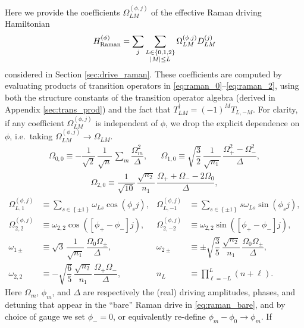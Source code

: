 \documentclass[nofootinbib,notitlepage,11pt]{revtex4-2}
\renewcommand{\t}{\text} %
\newcommand{\f}[2]{\dfrac{#1}{#2}} %
\newcommand{\p}[1]{\left(#1\right)} %
\renewcommand{\sp}[1]{\left[#1\right]} %
\renewcommand{\set}[1]{\left\{#1\right\}} %
\newcommand{\1}{\mathds{1}}
\begin{document}
Here we provide the coefficients $\Omega_{LM}^{(\phi,j)}$ of the
effective Raman driving Hamiltonian
\begin{align}
  H_{\t{Raman}}^{(\phi)}
  = \sum_j \sum_{\substack{L\in\set{0,1,2}\\\abs{M}\le L}}
  \Omega_{LM}^{(\phi,j)} D_{LM}^{(j)}
\end{align}
considered in Section \ref{sec:drive_raman}.  These coefficients are
computed by evaluating products of transition operators in
\eqref{eq:raman_0}--\eqref{eq:raman_2}, using both the structure
constants of the transition operator algebra (derived in Appendix
\ref{sec:trans_prod}) and the fact that
$T_{LM}^\dag = \p{-1}^M T_{L,-M}$.  For clarity, if any coefficient
$\Omega_{LM}^{(\phi,j)}$ is independent of $\phi$, we drop the
explicit dependence on $\phi$, i.e.~taking
$\Omega_{LM}^{(\phi,j)}\to\Omega_{LM}$.
\begin{align}
  \Omega_{0,0} \equiv -\f1{\sqrt{2}}\, \f1{\sqrt{n}}\,
  \sum_m\f{\Omega_m^2}{\Delta},
  &&
  \Omega_{1,0} \equiv \sqrt{\f32}\, \f1{\sqrt{n_1}}\,
  \f{\Omega_+^2 - \Omega_-^2}{\Delta},
  \label{eq:O_01_0}
\end{align}
\begin{align}
  \Omega_{2,0} \equiv \f1{\sqrt{10}}\, \f{\sqrt{n_2}}{n_1}\,
  \f{\Omega_+ + \Omega_- - 2\Omega_0}{\Delta},
  \label{eq:O_2_0}
\end{align}
\begin{align}
  \Omega_{L,1}^{(\phi,j)}
  &\equiv \sum_{s\in\set{\pm1}} \omega_{Ls} \cos\p{\phi_s j},
  &
  \Omega_{L,-1}^{(\phi,j)}
  &\equiv \sum_{s\in\set{\pm1}} s \omega_{Ls} \sin\p{\phi_s j}, \\
  \Omega_{2,2}^{(\phi,j)}
  &\equiv \omega_{2,2} \cos\p{\sp{\phi_+-\phi_-}j},
  &
  \Omega_{2,-2}^{(\phi,j)}
  &\equiv \omega_{2,2} \sin\p{\sp{\phi_+-\phi_-}j}, \\
  \omega_{1\pm}
  &\equiv \sqrt{3} \,\f1{\sqrt{n_1}}\,
  \f{\Omega_0 \Omega_\pm}{\Delta},
  &
  \omega_{2\pm}
  &\equiv \pm \sqrt{\f35}\, \f{\sqrt{n_2}}{n_1}\,
  \f{\Omega_0\Omega_\pm}{\Delta}, \\
  \omega_{2,2}
  &\equiv -\sqrt{\f65}\, \f{\sqrt{n_2}}{n_1}\,
  \f{\Omega_+\Omega_-}{\Delta},
  &
  n_L
  &\equiv \prod_{\ell=-L}^L \p{n+\ell}.
\end{align}
Here $\Omega_m$, $\phi_m$, and $\Delta$ are respectively the (real)
driving amplitudes, phases, and detuning that appear in the ``bare''
Raman drive in \eqref{eq:raman_bare}, and by choice of gauge we set
$\phi_-=0$, or equivalently re-define $\phi_m-\phi_0\to\phi_m$.  If
\end{document}
